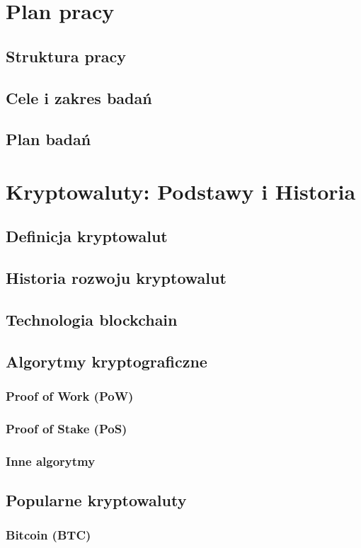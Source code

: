 \documentclass[12pt, a4paper, onside, polish]{article}				%
\begin{document}
\section{Plan pracy}
\subsection{Struktura pracy}
\subsection{Cele i zakres badań}
\subsection{Plan badań}

\section{Kryptowaluty: Podstawy i Historia}
\subsection{Definicja kryptowalut}
\subsection{Historia rozwoju kryptowalut}
\subsection{Technologia blockchain}
\subsection{Algorytmy kryptograficzne}
\subsubsection{Proof of Work (PoW)}
\subsubsection{Proof of Stake (PoS)}
\subsubsection{Inne algorytmy}
\subsection{Popularne kryptowaluty}
\subsubsection{Bitcoin (BTC)}
\end{document}

